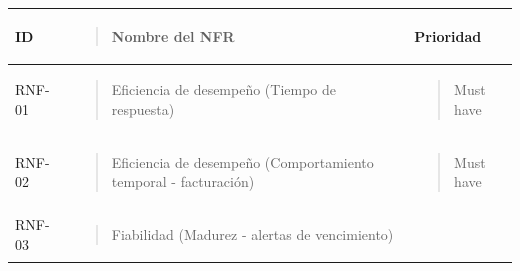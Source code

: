 \documentclass[
]{article}
\newcounter{none} %
\begin{document}
{\def\LTcaptype{none} %
\begin{longtable}[]{@{}
  >{\raggedright\arraybackslash}p{}
  >{\raggedright\arraybackslash}p{}
  >{\raggedright\arraybackslash}p{}@{}}
\toprule\noalign{}
\begin{minipage}[b]{\linewidth}\centering
\textbf{ID}
\end{minipage} & \begin{minipage}[b]{\linewidth}\raggedright
\begin{quote}
\textbf{Nombre del NFR}
\end{quote}
\end{minipage} & \begin{minipage}[b]{\linewidth}\centering
\textbf{Prioridad}
\end{minipage} \\
\midrule\noalign{}
\endhead
\bottomrule\noalign{}
\endlastfoot
RNF-01 & \begin{minipage}[t]{\linewidth}\raggedright
\begin{quote}
Eficiencia de desempeño (Tiempo de respuesta)
\end{quote}
\end{minipage} & \begin{minipage}[t]{\linewidth}\raggedright
\begin{quote}
Must have
\end{quote}
\end{minipage} \\
RNF-02 & \begin{minipage}[t]{\linewidth}\raggedright
\begin{quote}
Eficiencia de desempeño (Comportamiento temporal - facturación)
\end{quote}
\end{minipage} & \begin{minipage}[t]{\linewidth}\raggedright
\begin{quote}
Must have
\end{quote}
\end{minipage} \\
RNF-03 & \begin{minipage}[t]{\linewidth}\raggedright
\begin{quote}
Fiabilidad (Madurez - alertas de vencimiento)
\end{quote}
\end{minipage} & \begin{minipage}[t]{\linewidth}\raggedright

\end{minipage}
\end{longtable}}
\end{document}
